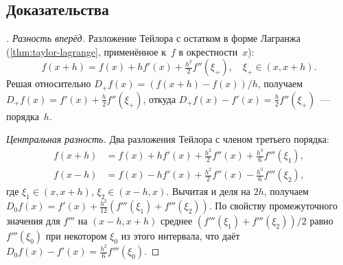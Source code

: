 \subsection*{Доказательства}

\begin{proof}[]
\emph{Разность вперёд.} Разложение Тейлора с остатком в форме Лагранжа
(\cref{thm:taylor-lagrange}, применённое к~$f$ в окрестности~$x$):
\[
  f(x + h) = f(x) + h f'(x) + \tfrac{h^2}{2} f''(\xi_+),
  \quad \xi_+ \in (x, x + h).
\]
Решая относительно $D_+ f(x) = (f(x + h) - f(x))/h$, получаем
$D_+ f(x) = f'(x) + \tfrac{h}{2} f''(\xi_+)$, откуда
$D_+ f(x) - f'(x) = \tfrac{h}{2} f''(\xi_+)$~--- порядка~$h$.

\emph{Центральная разность.} Два разложения Тейлора с членом третьего
порядка:
\begin{align*}
  f(x + h) &= f(x) + h f'(x) + \tfrac{h^2}{2} f''(x) + \tfrac{h^3}{6} f'''(\xi_1), \\
  f(x - h) &= f(x) - h f'(x) + \tfrac{h^2}{2} f''(x) - \tfrac{h^3}{6} f'''(\xi_2),
\end{align*}
где $\xi_1 \in (x, x + h)$, $\xi_2 \in (x - h, x)$. Вычитая и деля на
$2h$, получаем
$D_0 f(x) = f'(x) + \tfrac{h^2}{12}(f'''(\xi_1) + f'''(\xi_2))$. По
свойству промежуточного значения для $f'''$ на $(x - h, x + h)$
среднее $(f'''(\xi_1) + f'''(\xi_2))/2$ равно $f'''(\xi_0)$ при
некотором $\xi_0$ из этого интервала, что даёт
$D_0 f(x) - f'(x) = \tfrac{h^2}{6} f'''(\xi_0)$.
\end{proof}

